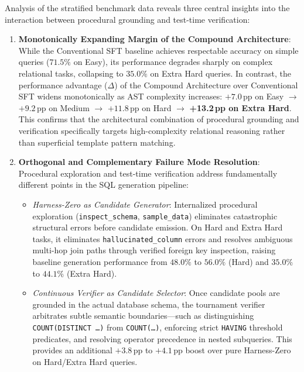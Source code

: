 \documentclass{article}
\theoremstyle{plain}
\theoremstyle{definition}
\theoremstyle{remark}
\begin{document}
Analysis of the stratified benchmark data reveals three central insights into the interaction between procedural grounding and test-time verification:

\begin{enumerate}[leftmargin=*,itemsep=3pt]
    \item \textbf{Monotonically Expanding Margin of the Compound Architecture}:  
    While the Conventional SFT baseline achieves respectable accuracy on simple queries ($71.5\%$ on Easy), its performance degrades sharply on complex relational tasks, collapsing to $35.0\%$ on Extra Hard queries. In contrast, the performance advantage ($\Delta$) of the Compound Architecture over Conventional SFT widens monotonically as AST complexity increases: $+7.0\,\text{pp}$ on Easy $\to$ $+9.2\,\text{pp}$ on Medium $\to$ $+11.8\,\text{pp}$ on Hard $\to$ \textbf{+13.2\,pp on Extra Hard}. This confirms that the architectural combination of procedural grounding and verification specifically targets high-complexity relational reasoning rather than superficial template pattern matching.

    \item \textbf{Orthogonal and Complementary Failure Mode Resolution}:  
    Procedural exploration and test-time verification address fundamentally different points in the SQL generation pipeline:
    \begin{itemize}[itemsep=1.5pt]
        \item \emph{Harness-Zero as Candidate Generator}: Internalized procedural exploration (\texttt{inspect\_schema}, \texttt{sample\_data}) eliminates catastrophic structural errors before candidate emission. On Hard and Extra Hard tasks, it eliminates \texttt{hallucinated\_column} errors and resolves ambiguous multi-hop join paths through verified foreign key inspection, raising baseline generation performance from $48.0\%$ to $56.0\%$ (Hard) and $35.0\%$ to $44.1\%$ (Extra Hard).
        \item \emph{Continuous Verifier as Candidate Selector}: Once candidate pools are grounded in the actual database schema, the tournament verifier arbitrates subtle semantic boundaries---such as distinguishing \texttt{COUNT(DISTINCT \dots)} from \texttt{COUNT(\dots)}, enforcing strict \texttt{HAVING} threshold predicates, and resolving operator precedence in nested subqueries. This provides an additional $+3.8\,\text{pp}$ to $+4.1\,\text{pp}$ boost over pure Harness-Zero on Hard/Extra Hard queries.
    \end{itemize}


\end{enumerate}
\end{document}
